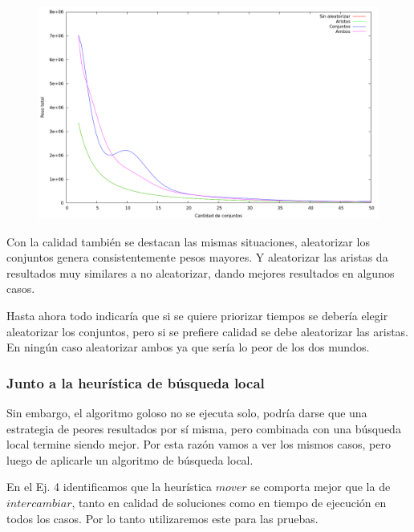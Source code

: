 \vspace*{0.5cm}

\vspace*{0.5cm}

\begin{figure}[H]
  \begin{center}
    \includegraphics[scale=0.35]{imagenes/grasp-goloso-k-peso.png}
  \end{center}
\end{figure}

\vspace*{0.5cm}

Con la calidad también se destacan las mismas situaciones, aleatorizar los
conjuntos genera consistentemente pesos mayores. Y aleatorizar las aristas da
resultados muy similares a no aleatorizar, dando mejores resultados en algunos
casos.

Hasta ahora todo indicaría que si se quiere priorizar tiempos se debería
elegir aleatorizar los conjuntos, pero si se prefiere calidad se debe
aleatorizar las aristas.
En ningún caso aleatorizar ambos ya que sería lo peor de los dos mundos.

\subsubsection{Junto a la heurística de búsqueda local}

Sin embargo, el algoritmo goloso no se ejecuta solo, podría darse que
una estrategia de peores resultados por sí misma, pero combinada con una
búsqueda local termine siendo mejor. Por esta razón vamos a ver los mismos
casos, pero luego de aplicarle un algoritmo de búsqueda local.

En el Ej. 4 identificamos que la heurística $mover$ se comporta mejor que
la de $intercambiar$, tanto en calidad de soluciones como en tiempo de
ejecución en todos los casos. Por lo tanto utilizaremos este para las pruebas.

